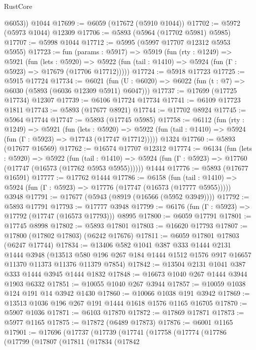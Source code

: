\begin{lexlean}{RustCore}
\begin{coremodule}
        @6053))
    @1044
@17699 := @6059 (@17672 (@5910 @1044))
@17702 := @5972 (@5973 @1044) @12309
@17706 := @5893 (@5964 (@17702 @5981) @5985)
@17707 := @5998 @1044
@17712 := @5995 (@5997 @17707 @12312 @5953 @5955)
@17723 := fun (params : @5917) =>
  @5919
    (fun (rty : @1249) =>
    @5921
      (fun (lets : @5920) =>
      @5922 (fun (tail : @1410) => @5924 (fun (Γ : @5923) => @17679 (@17706 @17712)))))
@17724 := @5918 @17723
@17725 := @5915 @17724
@17734 := @6021
    (fun (U : @6020) => @6022 (fun (t : @7) => @6030 (@5893 (@6036 @12309 @5911) @6047)))
@17737 := @17699 (@17725 @17734) @12307
@17739 := @6106 @17724 @17734
@17741 := @6109 @17723 @1811
@17743 := @5893 (@17677 @8921)
@17744 := @17702 @8924
@17745 := @5964 @17744
@17747 := @5893 (@17745 @5985)
@17758 := @6112
    (fun (rty : @1249) =>
    @5921
      (fun (lets : @5920) =>
      @5922 (fun (tail : @1410) => @5924 (fun (Γ : @5923) => @17743 (@17747 @17712)))))
    @1324
@17760 := @5893 (@17677 @16569)
@17762 := @16574 @17707 @12312
@17774 := @6134
    (fun (lets : @5920) =>
    @5922
      (fun (tail : @1410) =>
      @5924 (fun (Γ : @5923) => @17760 (@17747 (@16573 (@17762 @5953 @5955))))))
    @1444
@17776 := @5893 (@17677 @16591)
@17777 := @17762 @1444
@17786 := @6158
    (fun (tail : @1410) => @5924 (fun (Γ : @5923) => @17776 (@17747 (@16573 (@17777 @5955)))))
    @3948
@17791 := @17677 (@5943 (@8919 (@16566 (@5952 @3949))))
@17792 := @5893 @17791
@17793 := @17777 @3948
@17799 := @6176 (fun (Γ : @5923) => @17792 (@17747 (@16573 @17793))) @8995
@17800 := @6059 @17791
@17801 := @17745 @8998
@17802 := @5893 @17801
@17803 := @16620 @17793
@17807 := @17800 (@17802 @17803) (@6242 @17676)
@17811 := @6059 @17801 @17803 (@6247 @17744)
@17834 := @13406
    @582
    @1041
    @387
    @333
    @1444
    @2131
    @1444
    @3948
    (@13513 @580 @196 @267 @184 @1444 @1512 @1576 @917 @16657 @11370 @11373 @11376 @11379 @7854)
@17842 := @13504 @2131 @1041 @387 @333 @1444 @3945 @1444 @1832
@17848 := @16673 @1040 @267 @1444 @3944 @1903 @6332
@17851 := @10055 @1040 @267 @3944
@17857 := @10059 @1038 @124 @191 @14 @3942 @1430
@17860 := @10066 @1038 @191 @3942
@17869 := @13513 @1036 @196 @267 @191 @1444 @1618 @1576 @1165 @16705
@17870 := @5907 @1036
@17871 := @6103 @17870
@17872 := @17869 @17871
@17873 := @5977 @1165
@17875 := @17872 (@6489 @17873)
@17876 := @6001 @1165
@17901 := @17696
    (@17737
      (@17739
        (@17741
          (@17758
            (@17774
              (@17786
                (@17799
                  (@17807
                    (@17811
                      (@17834
                        (@17842

\end{coremodule}
\end{lexlean}
